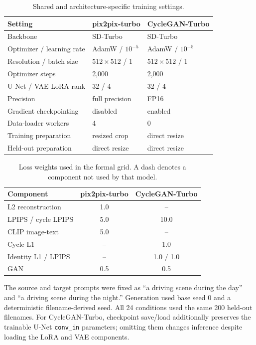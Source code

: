 \documentclass{article}
\begin{document}
\begin{table}[h]
  \caption{Shared and architecture-specific training settings.}
  \centering
  \small
  \setlength{\tabcolsep}{7pt}
  \begin{tabular}{lll}
    \toprule
    Setting & pix2pix-turbo & CycleGAN-Turbo \\
    \midrule
    Backbone & SD-Turbo & SD-Turbo \\
    Optimizer / learning rate & AdamW / $10^{-5}$ & AdamW / $10^{-5}$ \\
    Resolution / batch size & $512\times512$ / 1 & $512\times512$ / 1 \\
    Optimizer steps & 2,000 & 2,000 \\
    U-Net / VAE LoRA rank & 32 / 4 & 32 / 4 \\
    Precision & full precision & FP16 \\
    Gradient checkpointing & disabled & enabled \\
    Data-loader workers & 4 & 0 \\
    Training preparation & resized crop & direct resize \\
    Held-out preparation & direct resize & direct resize \\
    \bottomrule
  \end{tabular}
\end{table}

\begin{table}[h]
  \caption{Loss weights used in the formal grid. A dash denotes a component not used by that model.}
  \centering
  \small
  \setlength{\tabcolsep}{7pt}
  \begin{tabular}{lcc}
    \toprule
    Component & pix2pix-turbo & CycleGAN-Turbo \\
    \midrule
    L2 reconstruction & 1.0 & -- \\
    LPIPS / cycle LPIPS & 5.0 & 10.0 \\
    CLIP image-text & 5.0 & -- \\
    Cycle L1 & -- & 1.0 \\
    Identity L1 / LPIPS & -- & 1.0 / 1.0 \\
    GAN & 0.5 & 0.5 \\
    \bottomrule
  \end{tabular}
\end{table}

The source and target prompts were fixed as ``a driving scene during the day'' and ``a driving scene during the night.'' Generation used base seed 0 and a deterministic filename-derived seed. All 24 conditions used the same 200 held-out filenames. For CycleGAN-Turbo, checkpoint save/load additionally preserves the trainable U-Net \texttt{conv\_in} parameters; omitting them changes inference despite loading the LoRA and VAE components.
\end{document}
